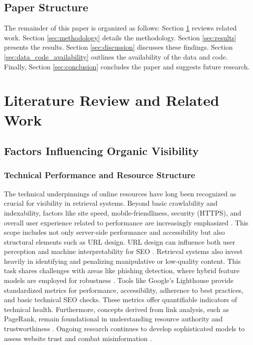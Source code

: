 \documentclass[a4paper,fleqn]{cas-sc}
\begin{document}
\subsection{Paper Structure}
\label{subsec:structure}
The remainder of this paper is organized as follows: Section \ref{sec:lit_review} reviews related work. Section \ref{sec:methodology} details the methodology. Section \ref{sec:results} presents the results. Section \ref{sec:discussion} discusses these findings. Section \ref{sec:data_code_availability} outlines the availability of the data and code. Finally, Section \ref{sec:conclusion} concludes the paper and suggests future research.

\section{Literature Review and Related Work}
\label{sec:lit_review}
\subsection{Factors Influencing Organic Visibility}
\label{subsec:lit_factors}

\subsubsection{Technical Performance and Resource Structure}
\label{subsubsec:lit_tech}
The technical underpinnings of online resources have long been recognized as crucial for visibility in retrieval systems. Beyond basic crawlability and indexability, factors like site speed, mobile-friendliness, security (HTTPS), and overall user experience related to performance are increasingly emphasized \citep{Roumeliotis2022}. This scope includes not only server-side performance and accessibility but also structural elements such as URL design. URL design can influence both user perception and machine interpretability for SEO \citep{Rastakhiz2024}. Retrieval systems also invest heavily in identifying and penalizing manipulative or low-quality content. This task shares challenges with areas like phishing detection, where hybrid feature models are employed for robustness \citep{Zhu2024}. Tools like Google's Lighthouse provide standardized metrics for performance, accessibility, adherence to best practices, and basic technical SEO checks. These metrics offer quantifiable indicators of technical health. Furthermore, concepts derived from link analysis, such as PageRank, remain foundational in understanding resource authority and trustworthiness \citep{Srinivas2025, Toms2004}. Ongoing research continues to develop sophisticated models to assess website trust and combat misinformation \citep{Niu2022}.
\end{document}
